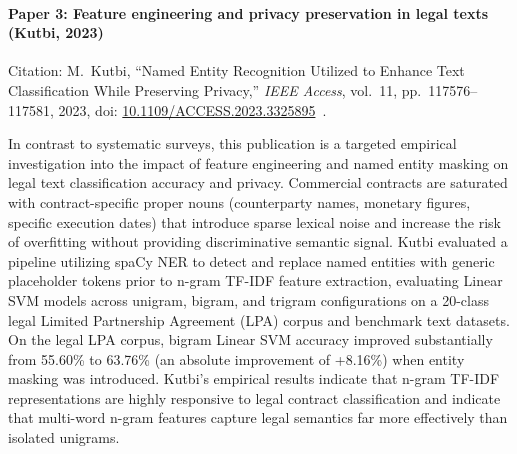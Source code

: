 \newpage
\paragraph*{Paper 3: Feature engineering and privacy preservation in legal texts (Kutbi, 2023)}

\noindent Citation: M.~Kutbi, ``Named Entity Recognition Utilized to Enhance Text Classification While Preserving Privacy,'' \textit{IEEE Access}, vol.~11, pp.~117576--117581, 2023, doi: \href{https://doi.org/10.1109/ACCESS.2023.3325895}{10.1109/ACCESS.2023.3325895}~\cite{kutbi2023named}.

\vspace{0.5em}
In contrast to systematic surveys, this publication is a targeted empirical investigation into the impact of feature engineering and named entity masking on legal text classification accuracy and privacy. Commercial contracts are saturated with contract-specific proper nouns (counterparty names, monetary figures, specific execution dates) that introduce sparse lexical noise and increase the risk of overfitting without providing discriminative semantic signal. Kutbi evaluated a pipeline utilizing spaCy NER to detect and replace named entities with generic placeholder tokens prior to n-gram TF-IDF feature extraction, evaluating Linear SVM models across unigram, bigram, and trigram configurations on a 20-class legal Limited Partnership Agreement (LPA) corpus and benchmark text datasets. On the legal LPA corpus, bigram Linear SVM accuracy improved substantially from 55.60\% to 63.76\% (an absolute improvement of +8.16\%) when entity masking was introduced. Kutbi's empirical results indicate that n-gram TF-IDF representations are highly responsive to legal contract classification and indicate that multi-word n-gram features capture legal semantics far more effectively than isolated unigrams.


